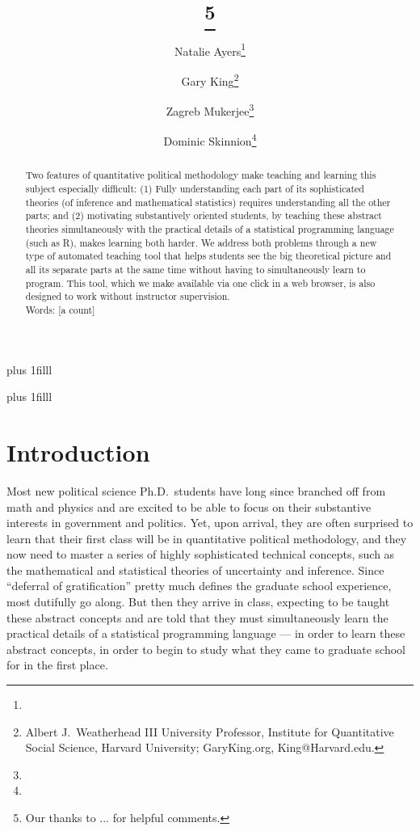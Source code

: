 \documentclass[12pt]{article}
\title{\titl}
\title{\titl\thanks{Our thanks to ... for helpful comments.}}
\author{Natalie Ayers\thanks{}\and Gary King\thanks{Albert J.\ Weatherhead
III University Professor, Institute for Quantitative Social
Science, Harvard University; GaryKing.org, King@Harvard.edu.}\and Zagreb Mukerjee\thanks{} \and Dominic Skinnion\thanks{}}
\newcommand{\btVFill}{\vskip0pt plus 1filll}
\theoremstyle{definition}
\begin{document}
\maketitle\thispagestyle{empty}\setcounter{page}{0}
\btVFill
\vspace{-2\baselineskip}
\begin{abstract}
  \noindent Two features of quantitative political methodology make teaching and learning this subject especially difficult: (1) Fully understanding each part of its sophisticated theories (of inference and mathematical statistics) requires understanding all the other parts; and (2) motivating substantively oriented students, by teaching these abstract theories simultaneously with the practical details of a statistical programming language (such as R), makes learning both harder. We address both problems through a new type of automated teaching tool that helps students see the big theoretical picture and all its separate parts at the same time without having to simultaneously learn to program. This tool, which we make available via one click in a web browser, is also designed to work without instructor supervision.
  \\
  \newline
\noindent Words: [a count] 
\end{abstract}
\btVFill
\clearpage
{}\baselineskip

\section{Introduction}\label{s:intro}

Most new political science Ph.D.\ students have long since branched off from math and physics and are excited to be able to focus on their substantive interests in government and politics. Yet, upon arrival, they are often surprised to learn that their first class will be in quantitative political methodology, and they now need to master a series of highly sophisticated technical concepts, such as the mathematical and statistical theories of uncertainty and inference. Since ``deferral of gratification'' pretty much defines the graduate school experience, most dutifully go along. But then they arrive in class, expecting to be taught these abstract concepts and are told that they must simultaneously learn the practical details of a statistical programming language --- in order to learn these abstract concepts, in order to begin to study what they came to graduate school for in the first place.
\end{document}
